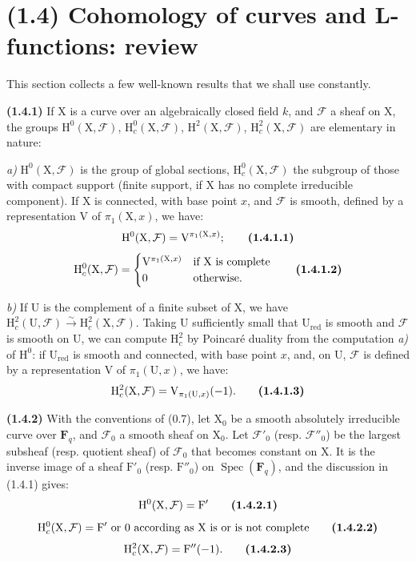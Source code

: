 \documentclass[11pt,leqno]{article}
\begin{document}
\section*{(1.4) Cohomology of curves and L-functions: review}

This section collects a few well-known results that we shall use constantly.

\textbf{(1.4.1)} If \(\mathrm{X}\) is a curve over an algebraically closed field \(k\), and \(\mathcal{F}\) a sheaf on \(\mathrm{X}\), the groups \(\mathrm{H}^0(\mathrm{X},\mathcal{F})\), \(\mathrm{H}_c^0(\mathrm{X},\mathcal{F})\), \(\mathrm{H}^2(\mathrm{X},\mathcal{F})\), \(\mathrm{H}_c^2(\mathrm{X},\mathcal{F})\) are elementary in nature:

\textit{a)} \(\mathrm{H}^0(\mathrm{X},\mathcal{F})\) is the group of global sections, \(\mathrm{H}_c^0(\mathrm{X},\mathcal{F})\) the subgroup of those with compact support (finite support, if \(\mathrm{X}\) has no complete irreducible component). If \(\mathrm{X}\) is connected, with base point \(x\), and \(\mathcal{F}\) is smooth, defined by a representation \(\mathrm{V}\) of \(\pi_1(\mathrm{X},x)\), we have:
\[
\mathrm{H}^0(\mathrm{X},\mathcal{F})=\mathrm{V}^{\pi_1(\mathrm{X},x)};
\tag*{\textbf{(1.4.1.1)}}
\]
\[
\mathrm{H}_c^0(\mathrm{X},\mathcal{F})=
\begin{cases}
\mathrm{V}^{\pi_1(\mathrm{X},x)} & \text{if \(\mathrm{X}\) is complete}\\
0 & \text{otherwise.}
\end{cases}
\tag*{\textbf{(1.4.1.2)}}
\]

\textit{b)} If \(\mathrm{U}\) is the complement of a finite subset of \(\mathrm{X}\), we have \(\mathrm{H}_c^2(\mathrm{U},\mathcal{F})\xrightarrow{\sim}\mathrm{H}_c^2(\mathrm{X},\mathcal{F})\). Taking \(\mathrm{U}\) sufficiently small that \(\mathrm{U}_{\mathrm{red}}\) is smooth and \(\mathcal{F}\) is smooth on \(\mathrm{U}\), we can compute \(\mathrm{H}_c^2\) by Poincaré duality from the computation \textit{a)} of \(\mathrm{H}^0\): if \(\mathrm{U}_{\mathrm{red}}\) is smooth and connected, with base point \(x\), and, on \(\mathrm{U}\), \(\mathcal{F}\) is defined by a representation \(\mathrm{V}\) of \(\pi_1(\mathrm{U},x)\), we have:
\[
\mathrm{H}_c^2(\mathrm{X},\mathcal{F})=\mathrm{V}_{\pi_1(\mathrm{U},x)}(-1).
\tag*{\textbf{(1.4.1.3)}}
\]

\textbf{(1.4.2)} With the conventions of (0.7), let \(\mathrm{X}_0\) be a smooth absolutely irreducible curve over \(\mathbf{F}_q\), and \(\mathcal{F}_0\) a smooth sheaf on \(\mathrm{X}_0\). Let \(\mathcal{F}'_0\) (resp. \(\mathcal{F}''_0\)) be the largest subsheaf (resp. quotient sheaf) of \(\mathcal{F}_0\) that becomes constant on \(\mathrm{X}\). It is the inverse image of a sheaf \(\mathrm{F}'_0\) (resp. \(\mathrm{F}''_0\)) on \(\operatorname{Spec}(\mathbf{F}_q)\), and the discussion in (1.4.1) gives:
\[
\mathrm{H}^0(\mathrm{X},\mathcal{F})=\mathrm{F}'
\tag*{\textbf{(1.4.2.1)}}
\]
\[
\mathrm{H}_c^0(\mathrm{X},\mathcal{F})=\mathrm{F}'\text{ or }0
\text{ according as }\mathrm{X}\text{ is or is not complete}
\tag*{\textbf{(1.4.2.2)}}
\]
\[
\mathrm{H}_c^2(\mathrm{X},\mathcal{F})=\mathrm{F}''(-1).
\tag*{\textbf{(1.4.2.3)}}
\]
\end{document}
